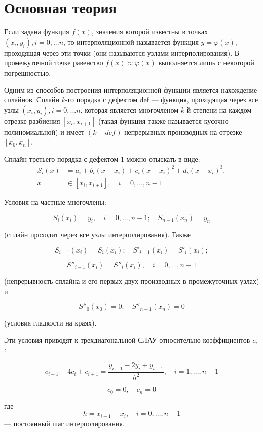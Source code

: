 \documentclass[a4paper, 14pt]{extarticle}
\begin{document}
\section{Основная теория}
\begin{flushleft}
	
Если задана функция $f(x)$, значения которой известны в точках $(x_i, y_i), i = 0, ... n$,
то интерполяционной называется функция $y = \varphi(x)$, проходящая через эти точки (они 
называются узлами интерполирования). В промежуточной точке равенство $f(x) \approx \varphi(x)$
выполняется лишь с некоторой погрешностью.

Одним из способов построения интерполяционной функции является нахождение сплайнов.
Сплайн $k$-го порядка с дефектом def — функция, проходящая через все узлы 
$(x_i, y_i), i = 0, ... n$, которая является многочленом $k$-й степени на каждом отрезке разбиения
$[x_i, x_{i+1}]$ (такая функция также называется кусочно-полиномиальной) и имеет $(k - def)$ 
непрерывных производных на отрезке $[x_0, x_n]$.

Сплайн третьего порядка с дефектом 1 можно отыскать в виде:
\[
\begin{aligned}
	S_i(x) &= a_i + b_i(x - x_i) + c_i(x - x_i)^2 + d_i(x - x_i)^3, \\
	x &\in [x_i, x_{i+1}], \quad i = 0, \dots, n-1
\end{aligned}
\]

Условия на частные многочлены:

\[
S_i(x_i) = y_i, \quad i = 0, \dots, n-1; \quad S_{n-1}(x_n) = y_n
\]

(сплайн проходит через все узлы интерполирования). Также 

\[
S_{i-1}(x_i) = S_i(x_i); \quad S'_{i-1}(x_i) = S'_i(x_i);
\]

\[
S''_{i-1}(x_i) = S''_i(x_i), \quad i = 0, \dots, n-1
\]

(непрерывность сплайна и его первых двух производных в промежуточных узлах) и 

\[
S''_0(x_0) = 0; \quad S''_{n-1}(x_n) = 0
\]

(условия гладкости на краях).  

Эти условия приводят к трехдиагональной СЛАУ относительно коэффициентов \( c_i \):

\[
c_{i-1} + 4c_i + c_{i+1} = \frac{y_{i+1} - 2y_i + y_{i-1}}{h^2}, \quad i = 1, \dots, n-1
\]

\[
c_0 = 0, \quad c_{n} = 0
\]

где  
\[
h = x_{i+1} - x_i, \quad i = 0, \dots, n-1
\]
— постоянный шаг интерполирования.


\end{flushleft}
\end{document}
